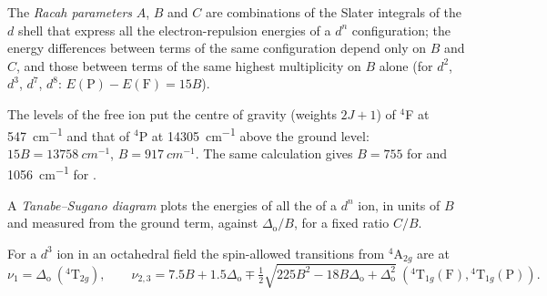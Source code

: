 \begin{definition}\label{def:b3:complex-spectra-magnetism:racah}
The \emph{Racah parameters} $A$, $B$ and $C$ are combinations of
the Slater integrals of the $d$ shell that express all the electron-repulsion
energies of a $d^n$ configuration; the energy differences between terms of the
same configuration depend only on $B$ and $C$, and those between terms of the same
highest multiplicity on $B$ alone (for $d^2$, $d^3$, $d^7$, $d^8$: $E(\mathrm P) - E(\mathrm F) = 15B$).
\end{definition}

\begin{example}\label{ex:b3:complex-spectra-magnetism:free-B}
The levels of the free  ion put the centre of gravity (weights $2J + 1$) of $^4$F at
\qty{547}{cm^{-1}} and that of $^4$P at \qty{14305}{cm^{-1}} above the ground level: $15B = \qty{13758}{cm^{-1}}$,
$B = \qty{917}{cm^{-1}}$. The same calculation gives $B = 755$ for  and \qty{1056}{cm^{-1}} for
.
\end{example}

\begin{definition}\label{def:b3:complex-spectra-magnetism:tanabe-sugano}
A \emph{Tanabe--Sugano diagram} plots the energies of
all the  of a $d^n$ ion, in units of $B$ and measured from the
ground term, against $\Delta_{\mathrm o}/B$, for a fixed ratio $C/B$.
\end{definition}

\begin{proposition}\label{prop:b3:complex-spectra-magnetism:d3-bands}
For a $d^3$ ion in an octahedral field the spin-allowed transitions from $^4$A$_{2g}$ are at
\[
  \nu_1 = \Delta_{\mathrm o}\ (^4\mathrm T_{2g}), \qquad
  \nu_{2,3} = 7.5B + 1.5\Delta_{\mathrm o} \mp \tfrac12\sqrt{225B^2 - 18B\Delta_{\mathrm o} + \Delta_{\mathrm o}^2}\ (^4\mathrm T_{1g}(\mathrm F), {}^4\mathrm T_{1g}(\mathrm P)).
\]
\end{proposition}

